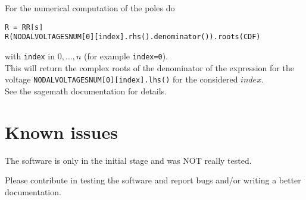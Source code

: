 \documentclass[a4paper]{article}
\begin{document}
For the numerical computation of the poles do 
\begin{verbatim}
R = RR[s]
R(NODALVOLTAGESNUM[0][index].rhs().denominator()).roots(CDF)
\end{verbatim}
with {\tt index} in $0,\ldots, n $ (for example {\tt index=0}).\\

This will return the complex roots of the denominator of the expression for the voltage {\tt NODALVOLTAGESNUM[0][index].lhs()} for the considered $index$.\\

See the sagemath documentation for details.


\section{Known issues}

The software is only in the initial stage and was NOT really tested. 

Please contribute in testing the software and report bugs and/or writing a better documentation.
\end{document}
